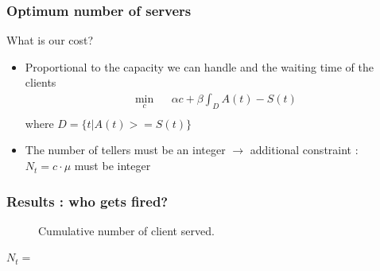 \documentclass[10pt]{beamer}
\begin{document}
\begin{frame}
\frametitle{Optimum number of servers}
\begin{block}{What is our cost?}
\begin{itemize}
\item Proportional to the capacity we can handle and the waiting time of the clients
\begin{eqnarray*}
\min_c & & \alpha c + \beta \int_D A(t)-S(t)\\
\end{eqnarray*}
where $D = \{t | A(t)>=S(t) \}$
\item The number of tellers must be an integer $\rightarrow$ additional constraint : $N_t = c \cdot \mu$ must be integer
\end{itemize}
\end{block}
\begin{figure}
\centering

\end{figure}
\end{frame}

\begin{frame}
\frametitle{Results : who gets fired?}
\begin{figure}
\centering
{}

\caption{Cumulative number of client served.}
\end{figure}
\begin{center}
$N_t = $ 
\end{center}
\end{frame}
\end{document}

